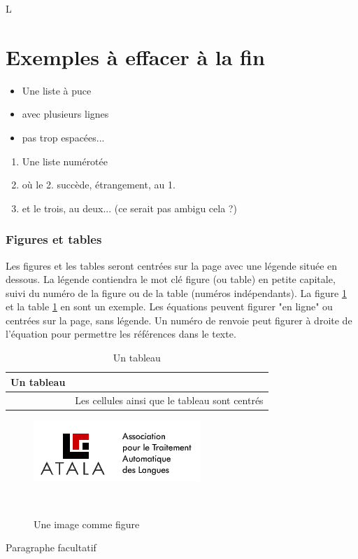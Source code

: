 \documentclass[10pt,a4paper,twoside]{article}
\begin{document}
\begin{itemize}
L

\section{Exemples à effacer à la fin}

\begin{itemize}
\item Une liste à puce
\item avec plusieurs lignes
\item pas trop espacées... 
\end{itemize}

\begin{enumerate}
\item Une liste numérotée
\item où le 2. succède, étrangement, au 1.
\item et le trois, au deux... (ce serait pas ambigu cela ?)
\end{enumerate}

\subsubsection{Figures et tables}

Les figures et les tables seront centrées sur la page avec une légende située en dessous. La légende contiendra le mot clé figure (ou table) en petite capitale, suivi du numéro de la figure ou de la table (numéros indépendants). La figure \ref{image} et la table \ref{table} en sont un exemple. Les équations peuvent figurer "en ligne" ou centrées sur la page, sans légende. Un numéro de renvoie peut figurer à droite de l'équation pour permettre les références dans le texte.

\begin{table}[!h]
\centering
	\begin{tabular}{|c|p{4cm}|}
	\hline
	Un tableau&\\
	\hline
	&Les cellules ainsi que le tableau sont centrés\\
	\hline
	\end{tabular}
\caption{Un tableau}\label{table}
\end{table}

\begin{figure}[htbp] 
\begin{center} 
\includegraphics{images/atala.png}
\end{center} 
\caption{Une image comme figure} \label{image} \
\end{figure}
Paragraphe facultatif


\end{itemize}
\end{document}
